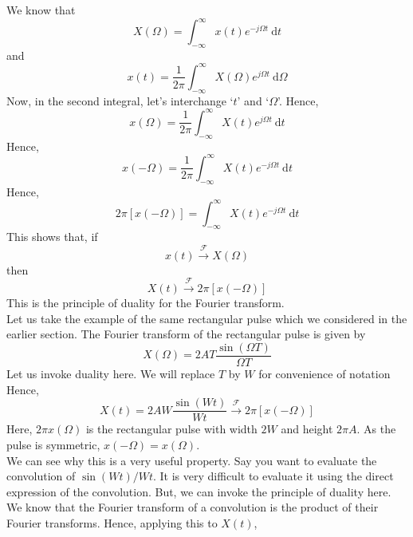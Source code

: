 	We know that
	\begin{equation}
		X(\Omega) = \int_{-\infty}^{\infty} \! x(t) e^{-j\Omega t} \ \mathrm{d}t
	\end{equation}	
	and
	\begin{equation}
		x(t) = \frac{1}{2\pi}\int_{-\infty}^{\infty} \! X(\Omega) e^{j\Omega t} \ \mathrm{d}\Omega
	\end{equation}
	Now, in the second integral, let's interchange `$t$' and `$\Omega$'. Hence,
	\begin{equation}
		x(\Omega) = \frac{1}{2\pi}\int_{-\infty}^{\infty} \! X(t) e^{j\Omega t} \ \mathrm{d}t
	\end{equation}
	Hence,
	\begin{equation}
		x(-\Omega) = \frac{1}{2\pi}\int_{-\infty}^{\infty} \! X(t) e^{-j\Omega t} \ \mathrm{d}t
	\end{equation}
	Hence,
	\begin{equation}
		2\pi [x(-\Omega)] = \int_{-\infty}^{\infty} \! X(t) e^{-j\Omega t} \ \mathrm{d}t
	\end{equation}
	This shows that, if
	\begin{equation}
		x(t) \xrightarrow{\mathcal{F}} X(\Omega)
	\end{equation}
	then
	\begin{equation}\label{eqn:duality}
	X(t) \xrightarrow{\mathcal{F}} 2\pi [x(-\Omega)]
	\end{equation}
	This is the principle of duality for the Fourier transform. \\
	Let us take the example of the same rectangular pulse which we considered in the earlier section. The Fourier transform of the rectangular pulse is given by
	\begin{equation}
		X(\Omega) = 2AT \frac{\sin(\Omega T)}{\Omega T}
	\end{equation}
	Let us invoke duality here. We will replace $T$ by $W$ for convenience of notation Hence,
	\begin{equation}
		X(t) = 2AW \frac{\sin{(W t)}}{W t} \xrightarrow{\mathcal{F}} 2\pi [x(-\Omega)]
	\end{equation}
	Here, $2\pi x(\Omega)$ is the rectangular pulse with width $2W$ and height $2\pi A$. As the pulse is symmetric, $x(-\Omega) = x(\Omega)$.\\
	We can see why this is a very useful property. Say you want to evaluate the convolution of $\sin(Wt)/Wt$. It is very difficult to evaluate it using the direct expression of the convolution. But, we can invoke the principle of duality here. We know that the Fourier transform of a convolution is the product of their Fourier transforms. Hence, applying this to $X(t)$,

